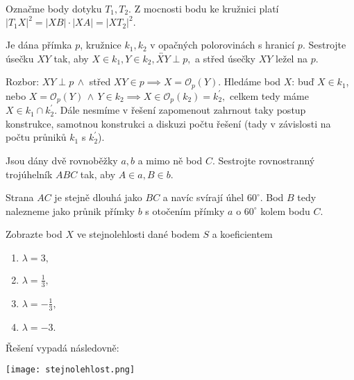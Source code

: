\begin{reseni}
Označme body dotyku $T_1,T_2.$ Z mocnosti bodu ke kružnici platí
$|T_1X|^2=|XB|\cdot |XA|=|XT_2|^2.$
\end{reseni}

\begin{priklad}
Je dána přímka $p$, kružnice $k_1, k_2$ v opačných polorovinách s hranicí $p.$
Sestrojte úsečku $XY$ tak, aby $X\in k_1, Y\in k_2, \overleftrightarrow{XY} \perp p,$ a
střed úsečky $XY$ ležel na $p.$
\end{priklad}

\begin{reseni}
Rozbor: $XY\perp p \, \land$ střed $XY\in p \implies X=\mathcal O_p(Y)$. Hledáme
bod $X$: buď $X \in k_1$, nebo $X=\mathcal O_p(Y) \, \land \, Y \in k_2 \implies X \in \mathcal O_p(k_2)=k_2^\prime,$ celkem
tedy máme $X\in k_1\cap k_2^\prime.$ Dále nesmíme v řešení zapomenout zahrnout taky postup
konstrukce, samotnou konstrukci a diskuzi počtu řešení (tady v závislosti na
počtu průniků $k_1$ s $k_2^\prime$).
\end{reseni}

\begin{priklad}
Jsou dány dvě rovnoběžky $a,b$ a mimo ně bod $C$. Sestrojte rovnostranný
trojúhelník $ABC$ tak, aby $A \in a, B \in b$.
\end{priklad}

\begin{reseni}
Strana $AC$ je stejně dlouhá jako $BC$ a navíc svírají úhel $60^\circ$. Bod
$B$ tedy nalezneme jako průnik přímky $b$ s otočením přímky $a$ o $60^\circ$ kolem
bodu $C.$
\end{reseni}

\begin{priklad}
Zobrazte bod $X$ ve stejnolehlosti dané bodem $S$ a koeficientem
\begin{enumerate}[$i.$]
\item $\lambda = 3,$
\item $\lambda = \frac{1}{3},$
\item $\lambda = -\frac{1}{3},$
\item $\lambda = -3.$
\end{enumerate}
\end{priklad}

\begin{reseni}
Řešení vypadá následovně:
\begin{center}
 \texttt{[image: stejnolehlost.png]}
\end{center}
\end{reseni}

